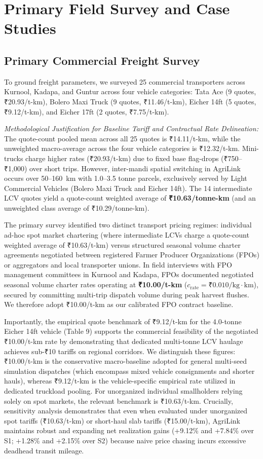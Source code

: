 \documentclass[journal]{IEEEtran}
\begin{document}
\section{Primary Field Survey and Case Studies}
\subsection{Primary Commercial Freight Survey}
To ground freight parameters, we surveyed 25 commercial transporters across Kurnool, Kadapa, and Guntur across four vehicle categories: Tata Ace (9 quotes, ₹20.93/t-km), Bolero Maxi Truck (9 quotes, ₹11.46/t-km), Eicher 14ft (5 quotes, ₹9.12/t-km), and Eicher 17ft (2 quotes, ₹7.75/t-km).

\textit{Methodological Justification for Baseline Tariff and Contractual Rate Delineation:} The quote-count pooled mean across all 25 quotes is ₹14.11/t-km, while the unweighted macro-average across the four vehicle categories is ₹12.32/t-km. Mini-trucks charge higher rates (₹20.93/t-km) due to fixed base flag-drops (₹750--₹1,000) over short trips. However, inter-mandi spatial switching in AgriLink occurs over 50--160~km with 1.0--3.5 tonne parcels, exclusively served by Light Commercial Vehicles (Bolero Maxi Truck and Eicher 14ft). The 14 intermediate LCV quotes yield a quote-count weighted average of \textbf{₹10.63/tonne-km} (and an unweighted class average of ₹10.29/tonne-km).

The primary survey identified two distinct transport pricing regimes: individual ad-hoc spot market chartering (where intermediate LCVs charge a quote-count weighted average of ₹10.63/t-km) versus structured seasonal volume charter agreements negotiated between registered Farmer Producer Organizations (FPOs) or aggregators and local transporter unions. In field interviews with FPO management committees in Kurnool and Kadapa, FPOs documented negotiated seasonal volume charter rates operating at \textbf{₹10.00/t-km} ($c_{\text{rate}} = \text{₹}0.010/\text{kg}\cdot\text{km}$), secured by committing multi-trip dispatch volume during peak harvest flushes. We therefore adopt ₹10.00/t-km as our calibrated FPO contract baseline. 

Importantly, the empirical quote benchmark of ₹9.12/t-km for the 4.0-tonne Eicher 14ft vehicle (Table 9) supports the commercial feasibility of the negotiated ₹10.00/t-km rate by demonstrating that dedicated multi-tonne LCV haulage achieves sub-₹10 tariffs on regional corridors. We distinguish these figures: ₹10.00/t-km is the conservative macro-baseline adopted for general multi-seed simulation dispatches (which encompass mixed vehicle consignments and shorter hauls), whereas ₹9.12/t-km is the vehicle-specific empirical rate utilized in dedicated truckload pooling. For unorganized individual smallholders relying solely on spot markets, the relevant benchmark is ₹10.63/t-km. Crucially, sensitivity analysis demonstrates that even when evaluated under unorganized spot tariffs (₹10.63/t-km) or short-haul slab tariffs (₹15.00/t-km), AgriLink maintains robust and expanding net realization gains (+9.12\% and +7.84\% over S1; +1.28\% and +2.15\% over S2) because naive price chasing incurs excessive deadhead transit mileage.
\end{document}
